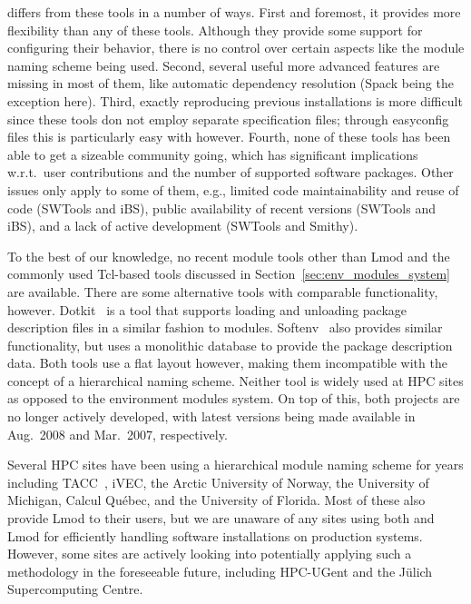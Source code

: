 \easybuild{} differs from these tools in a number of ways. First and foremost, it
provides more flexibility than any of these tools. Although they provide some support
for configuring their behavior, there is no control over certain aspects like the
module naming scheme being used. Second, several useful more advanced
features are missing in most of them, like automatic dependency resolution (Spack
being the exception here). Third, exactly reproducing previous installations is more
difficult since these tools don not employ separate specification files; through
easyconfig files this is particularly easy with \easybuild{} however.
Fourth, none of these tools has been able to get a sizeable community going, which
has significant implications w.r.t.\ user contributions and the number of supported
software packages.
Other issues only apply to some of them, e.g., limited code
maintainability and reuse of code (SWTools and iBS), public availability of recent
versions (SWTools and iBS), and a lack of active development (SWTools and Smithy).

To the best of our knowledge, no recent module tools other than Lmod and the commonly
used Tcl-based tools discussed in Section~\ref{sec:env_modules_system} are
available. There are some alternative tools with comparable functionality, however.
Dotkit~\cite{dotkit} is a tool that supports loading and unloading package description 
files in a similar fashion to modules. Softenv~\cite{softenv} also provides similar
functionality, but uses a monolithic database to provide the package description data.
Both tools use a flat layout however, making them incompatible with the concept of a
hierarchical naming scheme. Neither tool is widely used at HPC sites as
opposed to the environment modules system. On top of this, both projects are no longer
actively developed, with latest versions being made available in Aug.~2008 and
Mar.~2007, respectively.

Several HPC sites have been using a hierarchical module naming scheme for years
including TACC~\cite{lmodSC11}, iVEC, the Arctic University of Norway, the University
of Michigan, Calcul Qu\'ebec, and the University of Florida. Most of these also provide
Lmod to their users, but we are unaware of any sites using both \easybuild{} and Lmod
for efficiently handling software installations on production systems. However, some
sites are actively looking into potentially applying such a methodology in the
foreseeable future, including HPC-UGent and the J\"ulich Supercomputing Centre.
